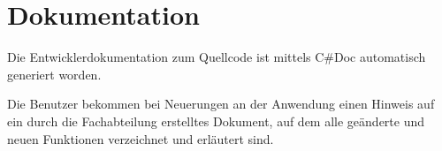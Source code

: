 \section{Dokumentation}
\label{sec:Dokumentation}

Die Entwicklerdokumentation zum Quellcode ist mittels C\#Doc automatisch generiert worden.

Die Benutzer bekommen bei Neuerungen an der Anwendung einen Hinweis auf ein durch die Fachabteilung erstelltes Dokument, auf dem alle geänderte und neuen Funktionen verzeichnet und erläutert sind. 




